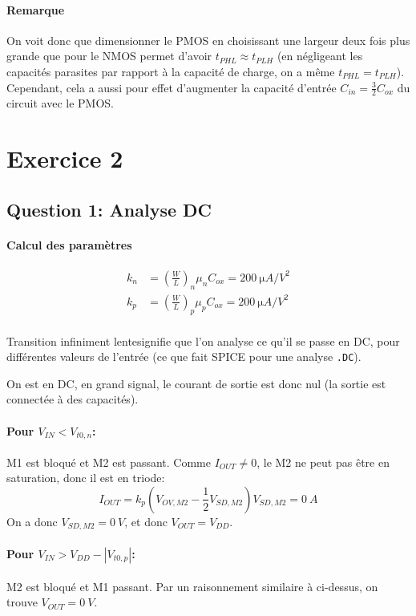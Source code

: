 \documentclass[frenchb,DIV=14]{scrartcl}
\begin{document}
\paragraph{Remarque} On voit donc que dimensionner le PMOS en choisissant une
largeur deux fois plus grande que pour le NMOS permet d'avoir $t_{PHL} \approx
t_{PLH}$ (en négligeant les capacités parasites par rapport à la capacité
de charge, on a même $t_{PHL} = t_{PLH}$). Cependant, cela a aussi pour effet
d'augmenter la capacité d'entrée $C_{in} = \frac{3}{2}C_{ox}$ du circuit avec
le PMOS.

\section*{Exercice 2}

\subsection*{Question 1: Analyse DC}

\paragraph{Calcul des paramètres}
\begin{align*}
    k_n &= \left(\frac{W}{L}\right)_n \mu_n C_{ox} = \SI{200}{\micro A/V^2} \\
    k_p &= \left(\frac{W}{L}\right)_p \mu_p C_{ox} = \SI{200}{\micro A/V^2} \\
\end{align*}

\og Transition infiniment lente\fg signifie que l'on analyse ce qu'il se passe
en DC, pour différentes valeurs de l'entrée (ce que fait SPICE pour une analyse
\texttt{.DC}).

On est en DC, en grand signal, le courant de sortie est donc nul (la sortie est
connectée à des capacités).

\paragraph{Pour $V_{IN} < V_{t0,n}$:}
M1 est bloqué et M2 est passant.
Comme $I_{OUT} \neq 0$, le M2 ne peut pas être en saturation,
donc il est en triode:
\[I_{OUT} = k_p \left(V_{OV,M2} - \frac{1}{2} V_{SD,M2}\right)V_{SD,M2} = \SI{0}{A}\]
On a donc $V_{SD,M2} = \SI{0}{V}$, et donc $V_{OUT} = V_{DD}$.

\paragraph{Pour $V_{IN} > V_{DD} - \left|V_{t0,p}\right|$:}
M2 est bloqué et M1 passant. Par un raisonnement similaire à ci-dessus,
on trouve $V_{OUT} = \SI{0}{V}$.
\end{document}

